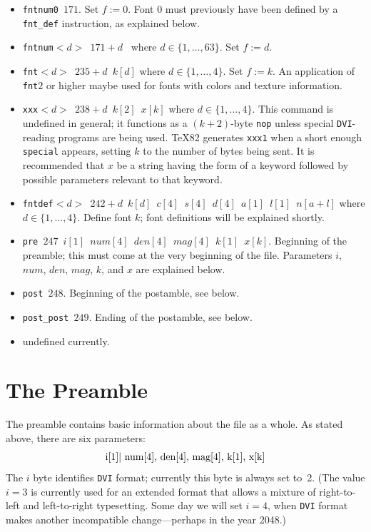\documentclass[10pt, a4paper, english]{article}
\begin{document}
\begin{itemize}
\item[171] \texttt{fntnum0 $171$}. 
Set $f:=0$. Font 0 must previously have been
defined by a \texttt{fnt\_def} instruction, as explained below.

\item[172--234] \texttt{fntnum$<d>$ $171+d$ } where $d\in\{1,\dots,63\}$. 
Set $f:=d$. 


\item[235--238] \texttt{fnt$<d>$ $235+d$ $k[d]$} where $d\in\{1,\dots,4\}$. 
Set $f:=k$. 
An application of \texttt{fnt$2$} or higher 
maybe used for fonts with colors and texture information. 

\item[239--242] \texttt{xxx$<d>$ $238+d$ $k[2]$ $x[k]$} 
where $d\in\{1,\dots,4\}$. 
This command is undefined in general; 
it functions as a $(k+2)$-byte \texttt{nop} 
unless special \texttt{DVI}-reading programs are being used. 
\TeX82 generates \texttt{xxx1} when a short enough \texttt{special} appears, 
setting $k$ to the number of bytes being sent. 
It is recommended that $x$ be a string having the form of a keyword 
followed by possible parameters relevant to that keyword.

\item[243--246] \texttt{fntdef$<d>$ $242+d$ 
$k[d]$ $c[4]$ $s[4]$ $d[4]$ $a[1]$ $l[1]$ $n[a+l]$} 
where $d\in\{1,\dots,4\}$. 
Define font $k$; font definitions will be explained shortly.

\item[247] \texttt{pre $247$ $i[1]$ $num[4]$ $den[4]$ $mag[4]$ $k[1]$ $x[k]$}.
Beginning of the preamble; 
this must come at the very beginning of the file. 
Parameters $i$, $num$, $den$, $mag$, $k$, and $x$ are explained below.

\item[248] \texttt{post $248$}. 
Beginning of the postamble, see below. 

\item[249] \texttt{post\_post $249$}. 
Ending of the postamble, see below. 

\item[250--255] undefined currently. 
\end{itemize}

\section{The Preamble}\label{sec:preamble}

The preamble contains basic information about the file as a whole. 
As stated above, there are six parameters:
%
\[
\hbox{i[1]| num[4], den[4], mag[4], k[1], x[k]}
\]
%
The $i$ byte identifies \texttt{DVI} format; 
currently this byte is always set to~2. 
(The value $i=3$ is currently used for an extended format that
allows a mixture of right-to-left and left-to-right typesetting.
Some day we will set $i=4$, when \texttt{DVI} format makes another
incompatible change---perhaps in the year 2048.)
\end{document}
